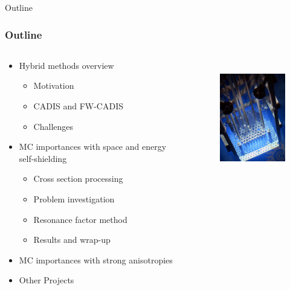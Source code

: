 \documentclass[xcolor=x11names,compress]{beamer}
\renewcommand{\(}{\begin{columns}}
\renewcommand{\)}{\end{columns}}
\newcommand{\<}[1]{\begin{column}{#1}}
\renewcommand{\>}{\end{column}}
\begin{document}
\begin{frame}[fragile]{Outline}
  \frametitle{Outline}

\begin{columns}
  \begin{column}{0.6\textwidth}
    \begin{itemize}
    \item Hybrid methods overview
    \begin{itemize}
    		\item Motivation
		\item CADIS and FW-CADIS
		\item Challenges
    \end{itemize}
    	\item MC importances with space and energy self-shielding
	\begin{itemize}
    		\item Cross section processing
		\item Problem investigation
		\item Resonance factor method
		\item Results and wrap-up
  	\end{itemize}
	\item MC importances with strong anisotropies
	\item Other Projects
  \end{itemize}
  \end{column}
  \begin{column}{0.4\textwidth}
  	\begin{figure}
  	\begin{center}
  		\includegraphics[height=2in,clip]{../figs/psu-reactor}
	\end{center}
  	\end{figure}
  \end{column}
\end{columns}

\end{frame}
\end{document}
